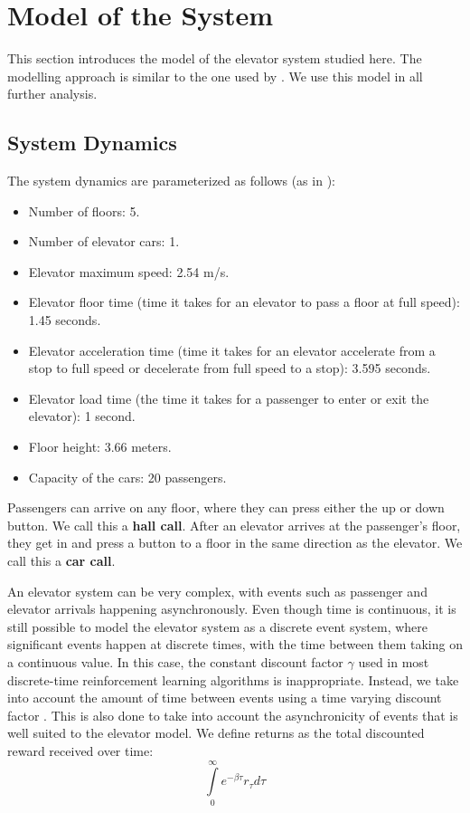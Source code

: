 \section{Model of the System}

This section introduces the model of the elevator system studied here. The modelling approach is similar to the one used by \cite{walczak2006, crites_barto_1998}. We use this model in all further analysis.

\subsection{System Dynamics}
The system dynamics are parameterized as follows (as in \cite{pepyne_96}):

\begin{itemize}
    \item Number of floors: 5.
    \item Number of elevator cars: 1.
    \item Elevator maximum speed: 2.54 m/s.
    \item Elevator floor time (time it takes for an elevator to pass a floor at full speed): 1.45 seconds.
    \item Elevator acceleration time (time it takes for an elevator accelerate from a stop to full speed or decelerate from full speed to a stop): 3.595 seconds.
    \item Elevator load time (the time it takes for a passenger to enter or exit the elevator): 1 second.
    \item Floor height: 3.66 meters.
    \item Capacity of the cars: 20 passengers.
\end{itemize}

Passengers can arrive on any floor, where they can press either the up or down button. We call this a \textbf{hall call}. After an elevator arrives at the passenger's floor, they get in and press a button to a floor in the same direction as the elevator. We call this a \textbf{car call}.

An elevator system can be very complex, with events such as passenger and elevator arrivals happening asynchronously. Even though time is continuous, it is still possible to model the elevator system as a discrete event system, where significant events happen at discrete times, with the time between them taking on a continuous value. In this case, the constant discount factor $\gamma$ used in most discrete-time reinforcement learning algorithms is inappropriate. Instead, we take into account the amount of time between events using a time varying discount factor \cite{bradtke_94}. This is also done to take into account the asynchronicity of events that is well suited to the elevator model. We define returns as the total discounted reward received over time:
\begin{equation}
    \int\limits_0^{\infty} e^{-\beta \tau} r_{\tau} d\tau
\end{equation}

